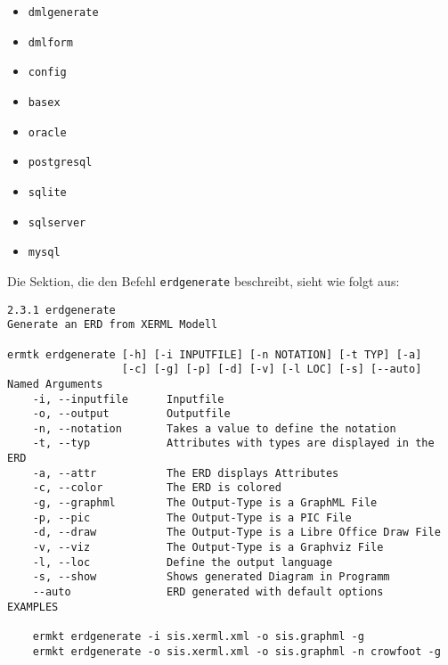 \noindent
\begin{itemize} \pra
	\item \verb|dmlgenerate|
	
	\item \verb|dmlform|
	
	\item \verb|config|

	\item \verb|basex| 
	
	\item \verb|oracle| 
	
	\item \verb|postgresql|
	
	\item \verb|sqlite| 
	
	\item \verb|sqlserver|
	
	\item \verb|mysql|
	\\
\end{itemize}

\noindent
Die Sektion, die den Befehl \verb|erdgenerate| beschreibt, sieht wie folgt aus:

\begin{verbatim}
2.3.1 erdgenerate
Generate an ERD from XERML Modell

ermtk erdgenerate [-h] [-i INPUTFILE] [-n NOTATION] [-t TYP] [-a]
                  [-c] [-g] [-p] [-d] [-v] [-l LOC] [-s] [--auto]
Named Arguments
    -i, --inputfile      Inputfile
    -o, --output         Outputfile
    -n, --notation       Takes a value to define the notation
    -t, --typ            Attributes with types are displayed in the ERD
    -a, --attr           The ERD displays Attributes
    -c, --color          The ERD is colored
    -g, --graphml        The Output-Type is a GraphML File
    -p, --pic            The Output-Type is a PIC File
    -d, --draw           The Output-Type is a Libre Office Draw File
    -v, --viz            The Output-Type is a Graphviz File
    -l, --loc            Define the output language
    -s, --show           Shows generated Diagram in Programm
    --auto               ERD generated with default options
EXAMPLES

    ermkt erdgenerate -i sis.xerml.xml -o sis.graphml -g
    ermkt erdgenerate -o sis.xerml.xml -o sis.graphml -n crowfoot -g
\end{verbatim}\pra